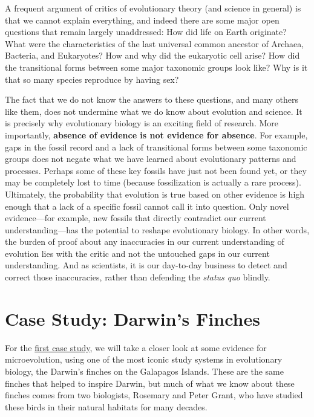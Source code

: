 \documentclass[
]{book}
\begin{document}
A frequent argument of critics of evolutionary theory (and science in general) is that we cannot explain everything, and indeed there are some major open questions that remain largely unaddressed: How did life on Earth originate? What were the characteristics of the last universal common ancestor of Archaea, Bacteria, and Eukaryotes? How and why did the eukaryotic cell arise? How did the transitional forms between some major taxonomic groups look like? Why is it that so many species reproduce by having sex?

The fact that we do not know the answers to these questions, and many others like them, does not undermine what we do know about evolution and science. It is precisely why evolutionary biology is an exciting field of research. More importantly, \textbf{absence of evidence is not evidence for absence}. For example, gaps in the fossil record and a lack of transitional forms between some taxonomic groups does not negate what we have learned about evolutionary patterns and processes. Perhaps some of these key fossils have just not been found yet, or they may be completely lost to time (because fossilization is actually a rare process). Ultimately, the probability that evolution is true based on other evidence is high enough that a lack of a specific fossil cannot call it into question. Only novel evidence---for example, new fossils that directly contradict our current understanding---has the potential to reshape evolutionary biology. In other words, the burden of proof about any inaccuracies in our current understanding of evolution lies with the critic and not the untouched gaps in our current understanding. And as scientists, it is our day-to-day business to detect and correct those inaccuracies, rather than defending the \emph{status quo} blindly.

\hypertarget{case-study-darwins-finches}{%
\section{Case Study: Darwin's Finches}\label{case-study-darwins-finches}}

For the \href{exercises/BIOL520-ex1.zip}{first case study}, we will take a closer look at some evidence for microevolution, using one of the most iconic study systems in evolutionary biology, the Darwin's finches on the Galapagos Islands. These are the same finches that helped to inspire Darwin, but much of what we know about these finches comes from two biologists, Rosemary and Peter Grant, who have studied these birds in their natural habitats for many decades.
\end{document}
